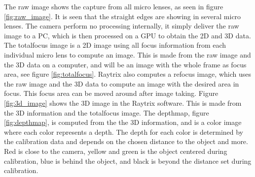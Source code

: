 The raw image shows the capture from all micro lenses, as seen in figure \ref{fig:raw_image}. It is seen that the straight edges are showing in several micro lenses. The camera perform no processing internally, it simply deliver the raw image to a PC, which is then processed on a GPU to obtain the 2D and 3D data. 
The totalfocus image is a 2D image using all focus information from each individual micro lens to compute an image. This is made from the raw image and the 3D data on a computer, and will be an image with the whole frame as focus area, see figure \ref{fig:totalfocus}. 
Raytrix also computes a refocus image, which uses the raw image and the 3D data to compute an image with the desired area in focus. This focus area can be moved around after image taking.
Figure \ref{fig:3d_image} shows the 3D image in the Raytrix software. This is made from the 3D information and the totalfocus image. 
The depthmap, figure \ref{fig:depthmap}, is computed from the the 3D information, and is a color image where each color represents a depth. The depth for each color is determined by the calibration data and depends on the chosen distance to the object and more. 
Red is close to the camera, yellow and green is the object centered during calibration, blue is behind the object, and black is beyond the distance set during calibration.


